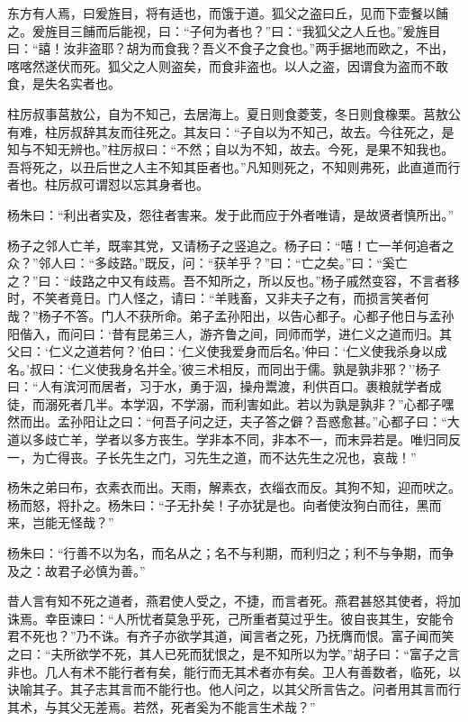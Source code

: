 \documentclass[]{article}
\begin{document}
东方有人焉，曰爰旌目，将有适也，而饿于道。狐父之盗曰丘，见而下壶餐以餔之。爰旌目三餔而后能视，曰：``子何为者也？''曰：``我狐父之人丘也。''爰旌目曰：``譆！汝非盗耶？胡为而食我？吾义不食子之食也。''两手据地而欧之，不出，喀喀然遂伏而死。狐父之人则盗矣，而食非盗也。以人之盗，因谓食为盗而不敢食，是失名实者也。

柱厉叔事莒敖公，自为不知己，去居海上。夏日则食菱芰，冬日则食橡栗。莒敖公有难，柱厉叔辞其友而往死之。其友曰：``子自以为不知己，故去。今往死之，是知与不知无辨也。''柱厉叔曰：``不然；自以为不知，故去。今死，是果不知我也。吾将死之，以丑后世之人主不知其臣者也。''凡知则死之，不知则弗死，此直道而行者也。柱厉叔可谓怼以忘其身者也。

杨朱曰：``利出者实及，怨往者害来。发于此而应于外者唯请，是故贤者慎所出。''

杨子之邻人亡羊，既率其党，又请杨子之竖追之。杨子曰：``嘻！亡一羊何追者之众？''邻人曰：``多歧路。''既反，问：``获羊乎？''曰：``亡之矣。''曰：``奚亡之？''曰：``歧路之中又有歧焉。吾不知所之，所以反也。''杨子戚然变容，不言者移时，不笑者竟日。门人怪之，请曰：``羊贱畜，又非夫子之有，而损言笑者何哉？''杨子不答。门人不获所命。弟子孟孙阳出，以告心都子。心都子他日与孟孙阳偕入，而问曰：`昔有昆弟三人，游齐鲁之间，同师而学，进仁义之道而归。其父曰：`仁义之道若何？'伯曰：`仁义使我爱身而后名。'仲曰：`仁义使我杀身以成名。'叔曰：`仁义使我身名并全。'彼三术相反，而同出于儒。孰是孰非邪？''杨子曰：``人有滨河而居者，习于水，勇于泅，操舟鬻渡，利供百口。裹粮就学者成徒，而溺死者几半。本学泅，不学溺，而利害如此。若以为孰是孰非？''心都子嘿然而出。孟孙阳让之曰：``何吾子问之迂，夫子答之僻？吾惑愈甚。''心都子曰：``大道以多歧亡羊，学者以多方丧生。学非本不同，非本不一，而末异若是。唯归同反一，为亡得丧。子长先生之门，习先生之道，而不达先生之况也，哀哉！''

杨朱之弟曰布，衣素衣而出。天雨，解素衣，衣缁衣而反。其狗不知，迎而吠之。杨而怒，将扑之。杨朱曰：``子无扑矣！子亦犹是也。向者使汝狗白而往，黑而来，岂能无怪哉？''

杨朱曰：``行善不以为名，而名从之；名不与利期，而利归之；利不与争期，而争及之：故君子必慎为善。''

昔人言有知不死之道者，燕君使人受之，不捷，而言者死。燕君甚怒其使者，将加诛焉。幸臣谏曰：``人所忧者莫急乎死，己所重者莫过乎生。彼自丧其生，安能令君不死也？''乃不诛。有齐子亦欲学其道，闻言者之死，乃抚膺而恨。富子闻而笑之曰：``夫所欲学不死，其人已死而犹恨之，是不知所以为学。''胡子曰：``富子之言非也。几人有术不能行者有矣，能行而无其术者亦有矣。卫人有善数者，临死，以诀喻其子。其子志其言而不能行也。他人问之，以其父所言告之。问者用其言而行其术，与其父无差焉。若然，死者奚为不能言生术哉？''
\end{document}
